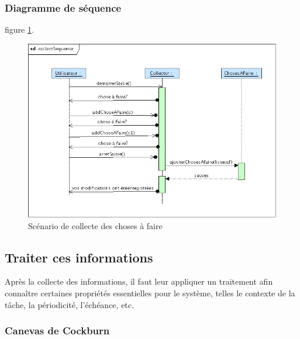 \subsubsection{Diagramme de séquence}
figure \ref{collectSequence}.
\begin{figure}[!ht]
\begin{center}
\includegraphics[width=12cm]{images/collectSequence.png}
\caption{Scénario de collecte des choses à faire}
\label{collectSequence}
\end{center}
\end{figure}



\subsection{Traiter ces informations}
Après la collecte des informations, il faut leur appliquer un traitement afin connaître certaines propriétés essentielles pour le système, telles le contexte de la tâche, la périodicité, l'échéance, etc.

\subsubsection{Canevas de Cockburn}

